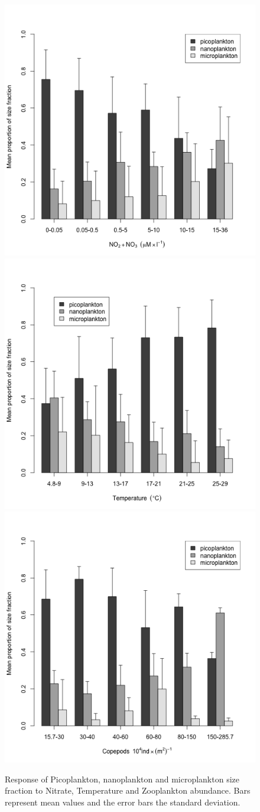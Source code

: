 \begin{figure}
\includegraphics[trim = 0mm 0mm 0mm 15mm, clip, width=0.5\linewidth]{./Chp2-Pre/amt_NO3_bars2.png}
\includegraphics[trim = 0mm 0mm 0mm 15mm, clip, width=0.5\linewidth]{./Chp2-Pre/amt_Temp_bars2.png}
\includegraphics[trim = 0mm 0mm 0mm 15mm, clip, width=0.5\linewidth]{./Chp2-Pre/amt_zoo_bars2.png}
\caption[Scheme]{\small {Response of Picoplankton, nanoplankton and microplankton size fraction to Nitrate, Temperature and Zooplankton abundance. Bars represent mean values and the error bars the standard deviation.}}
\label{response}
\end{figure}

